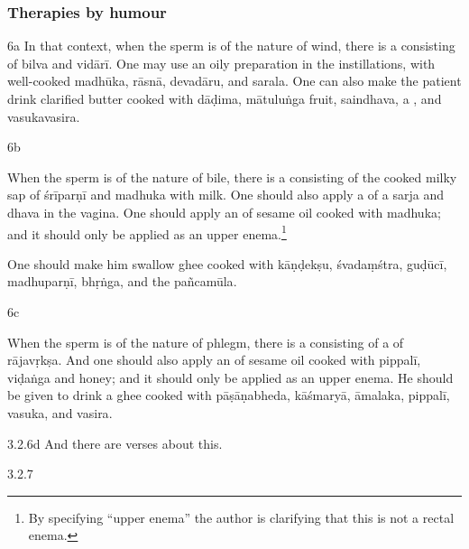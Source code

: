 \begin{translation}
\begin{sloka}
 \end{sloka}
 
 \subsubsection{Therapies by humour}
 
 \item[6a] In that context, when the sperm is of the nature of wind, there is
a 
consisting of \gls{bilva} and \gls{vidārī}.
% 
One may use an oily preparation in the instillations, with well-cooked
\gls{madhūka}, \gls{rāsnā}, \gls{devadāru}, and \gls{sarala}.
%
One can also make the patient drink clarified butter cooked with
\gls{dāḍima}, \gls{mātuluṅga} fruit, \gls{saindhava}, a
, and \gls{vasukavasira}.
 
 
 
 \item[6b]
 
 When the sperm is of the nature of bile, there is  a
   consisting of the cooked milky sap of 
  \gls{śrīparṇī} and \gls{madhuka} with milk.
  One should also apply a  of a
  \gls{sarja} and \gls{dhava}
  in the vagina.  
 One should apply an  of sesame oil cooked with 
 \gls{madhuka}; and it should only be applied as an upper enema.\footnote{By 
 specifying 
 “upper enema” the author is clarifying that this is not a rectal enema.}

  One should make him swallow ghee cooked with 
  \gls{kāṇḍekṣu},
  \gls{śvadaṃśtra},
  \gls{guḍūcī},
  \gls{madhuparṇī},
  \gls{bhṛṅga},
  and 
  the \gls{pañcamūla}.
  
 \item[6c]
 
  When the sperm is of the nature of phlegm, there is  a
 consisting of a   of
\gls{rājavṛkṣa}.  And one should also apply an  of sesame oil cooked with \gls{pippalī}, \gls{viḍaṅga} and
honey; and it should only be applied as an upper enema. 
He should be given to drink a ghee cooked with 
\gls{pāṣāṇabheda},
\gls{kāśmaryā},
\gls{āmalaka},
\gls{pippalī},
\gls{vasuka}, and 
\gls{vasira}.
 
 
 \item[3.2.6d]  And there are verses about this.
 
 \item [3.2.7]
 

\end{translation}
